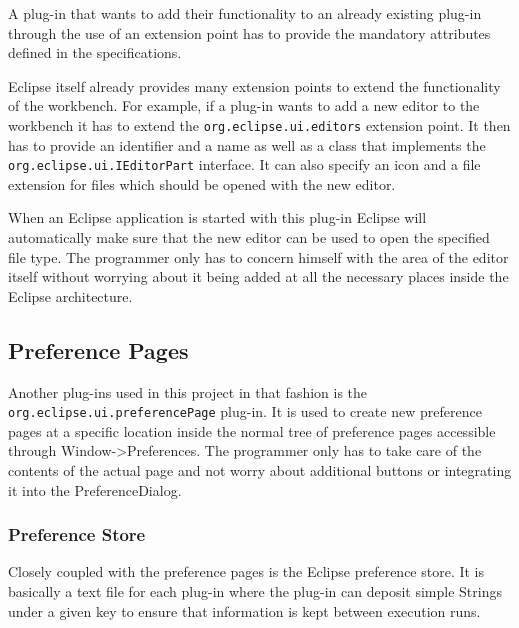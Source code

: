 A plug-in that wants to add their functionality to an already existing plug-in
through the use of an extension point has to provide the mandatory attributes defined in the 
specifications.

\listingjava
\lstset{
backgroundcolor=,
}
Eclipse itself already provides many extension points to extend the functionality of the workbench.
For example, if a plug-in wants to add a new editor to the workbench it has to extend the 
\lstinline|org.eclipse.ui.editors| extension point. It then has to provide an identifier and a name
as well as a class that implements the \lstinline|org.eclipse.ui.IEditorPart| interface. It can also specify an
icon and a file extension for files which should be opened with the new editor.

When an Eclipse application is started with this plug-in Eclipse will automatically make sure that the new editor
can be used to open the specified file type. The programmer only has to concern himself with the area of the editor
itself without worrying about it being added at all the necessary places inside the Eclipse architecture.

\subsection{Preference Pages}
\label{section:TechPreferencePage}
Another plug-ins used in this project in that fashion is the \lstinline|org.eclipse.ui.preferencePage|
plug-in. It is used to create new preference pages at a specific location inside the
normal tree of preference pages accessible through Window->Preferences.
The programmer only has to take care of the contents of the actual page and not worry
about additional buttons or integrating it into the PreferenceDialog.

\subsubsection{Preference Store}
\label{section:TechPreferenceStore}
Closely coupled with the preference pages is the Eclipse preference store. It is
basically a text file for each plug-in where the plug-in can deposit simple Strings
under a given key to ensure that information is kept between execution runs.
